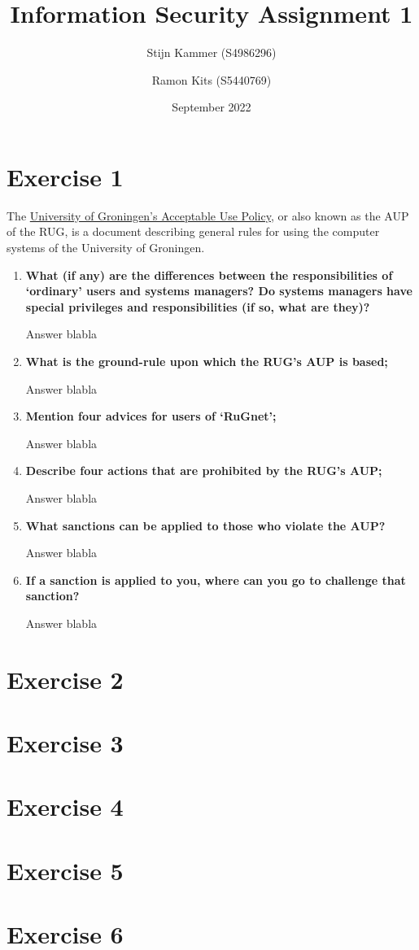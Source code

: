 \documentclass{report}
\title{Information Security Assignment 1}
\author{
    Stijn Kammer (S4986296)
    \and Ramon Kits (S5440769)
}
\date{September 2022}
\begin{document}
\maketitle

\section*{Exercise 1}
The \href{
    https://www.rug.nl/society-business/centre-for-information-technology/security/aup/
}{University of Groningen's Acceptable Use Policy},
or also known as the AUP of the RUG, is a document describing general rules for
using the computer systems of the University of Groningen.

\begin{enumerate}
    \item \textbf{What (if any) are the differences between the responsibilities of `ordinary'
              users and systems managers? Do systems managers have special privileges
              and responsibilities (if so, what are they)?}

          Answer blabla
    \item \textbf{What is the ground-rule upon which the RUG's AUP is based;}

          Answer blabla
    \item \textbf{Mention four advices for users of `RuGnet';}

          Answer blabla
    \item \textbf{Describe four actions that are prohibited by the RUG's AUP;}

          Answer blabla
    \item \textbf{What sanctions can be applied to those who violate the AUP?}

          Answer blabla
    \item \textbf{If a sanction is applied to you, where can you go to challenge that sanction?}

          Answer blabla
\end{enumerate}

\section*{Exercise 2}

\section*{Exercise 3}

\section*{Exercise 4}

\section*{Exercise 5}

\section*{Exercise 6}
\end{document}
